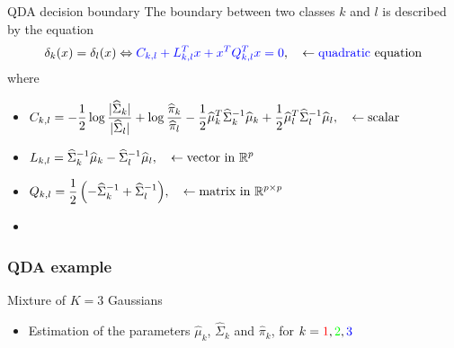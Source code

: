 \begin{frame}{QDA decision boundary}
The boundary between two classes $k$ and $l$ is described by the equation
\begin{align*}
\delta_k(x)= \delta_l(x)  \Leftrightarrow {\textcolor{blue}{ C_{k,l} + L_{k,l}^T x + x^T  Q_{k,l}^T x= 0}}, \quad \leftarrow \text{{\textcolor{blue}{quadratic}} equation}
\end{align*}
where
\begin{itemize}
 \item $\begin{displaystyle}
        C_{k,l}= { -\frac{1}{2} \log \frac{|\widehat{\Sigma}_k|}{ |\widehat{\Sigma}_l|} + \log \frac{\widehat{\pi}_k}{\widehat{\pi}_l}
        - \frac{1}{2} {\widehat{\mu}_k}^T \widehat{\Sigma}_k^{-1} \widehat{\mu}_k + \frac{1}{2}
 {\widehat{\mu}_l}^T \widehat{\Sigma}_l^{-1} \widehat{\mu}_l},
       \end{displaystyle} \quad \leftarrow \text{scalar}$
 \item $\begin{displaystyle}
          L_{k,l}= { \widehat{\Sigma}_k^{-1} \widehat{\mu}_k - \widehat{\Sigma}_l^{-1} \widehat{\mu}_l},
        \end{displaystyle}\quad \leftarrow \text{vector in } \mathbb{R}^p$
\item $\begin{displaystyle}
          Q_{k,l}= { \frac{1}{2} \left( -\widehat{\Sigma}_k^{-1} + \widehat{\Sigma}_l^{-1} \right)},
        \end{displaystyle}\quad \leftarrow \text{matrix in } \mathbb{R}^{p \times p}$
\end{itemize}

\begin{itemize}
 \item[\doigt] 
\end{itemize}


\end{frame}



\begin{frame}
  \frametitle{QDA example}
\begin{block}{Mixture of $K=3$ Gaussians}
\begin{itemize}
   \item Estimation of the parameters $\hat{\mu}_k$, $\hat{\Sigma}_k$ and $\hat{\pi}_k$, for
   $k= \textcolor{red}{1},\textcolor{green}{2},\textcolor{blue}{3}$
\end{itemize}
\end{block}
\vspace*{-5mm}


\begin{center}
\end{center}

\end{frame}

